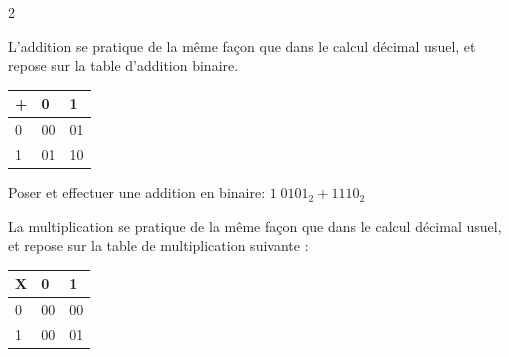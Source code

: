 	\begin{propriete}{}

		\begin{multicols}{2}

		L'addition se pratique de la même façon que dans le calcul décimal usuel, et repose sur la table d'addition binaire. 


		\columnbreak
		
		\begin{center}
		
		\begin{tabular}{|l|l|l|}
		\hline
		\rowcolor{red}+ & 0 & 1 \\ 
		\hline
		\cellcolor{red}0 & 00 & 01 \\ 
		\hline
		\cellcolor{red}1 & 01 & 10 \\ 
		\hline
		\end{tabular}
		\end{center}
		
		\end{multicols}
	\end{propriete}

	\begin{exercice_cours}{Poser et effectuer une addition en binaire: $1 \; 0101_2+1110_2$}{}
	\end{exercice_cours}

	\begin{propriete}{}
		\begin{minipage}{0.8\linewidth}
			La multiplication se pratique de la même façon que dans le calcul décimal usuel, et repose sur la table de multiplication suivante :

\end{minipage}\hfill
\begin{minipage}{0.18\linewidth}
\begin{center}

\begin{tabular}{|l|l|l|}
\hline
\rowcolor{red}X & 0 & 1 \\ 
\hline
\cellcolor{red}0 & 00 & 00 \\ 
\hline
\cellcolor{red}1 & 00 & 01 \\ 
\hline
\end{tabular}
\end{center}
\end{minipage}
	\end{propriete}
	
	\begin{exercice_cours}{}
	\vspace{2cm}
	\end{exercice_cours}

